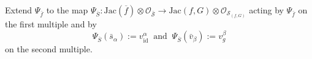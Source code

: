 \documentclass[reqno,12pt]{amsart}
\numberwithin{equation}{section}
\theoremstyle{plain}
\newtheorem{proposition}[theorem]{Proposition}
\theoremstyle{definition}
\newtheorem{definition}[theorem]{Definition}
\newcommand\DistTo{\xrightarrow{
   \,\smash{\raisebox{-0.65ex}{\ensuremath{\scriptstyle\sim}}}\,}}
\newcommand{\CC}{{\mathbb{C}}}
\newcommand{\Jac}{\mathrm{Jac}}
\newcommand{\id}{\mathrm{id}}
\def\D{{\mathcal D}}
\def\H{{\mathcal H}}
\def\O{{\mathcal O}}
\numberwithin{equation}{section}
\begin{document}
Extend $\Psi_{\bar{f}}$ to the map $\Psi_{\overline S}: \Jac(\overline f) \otimes \O_{\mathcal{\bar{S}}} \to \Jac(f,G) \otimes \O_{\mathcal{S}_{(f,G)}}$ acting by $\Psi_{\bar{f}}$ on the first multiple and by  
\[
    \Psi_{\overline S}(\bar{s}_{\alpha}) := v_{\id}^{\alpha} \ \text{ and } \ \Psi_{\overline S}(\bar{v}_\beta) := v_g^\beta
\]
on the second multiple.
% 
% 
% 
\end{document}
